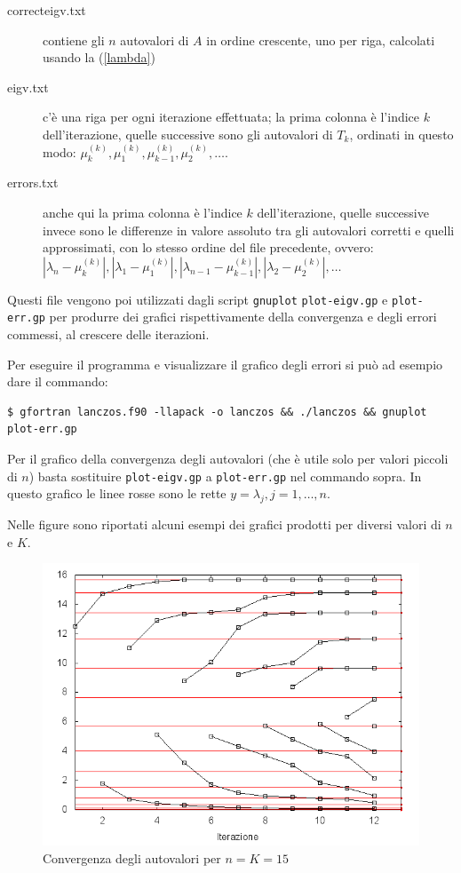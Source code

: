\documentclass[11pt]{article}
\numberwithin{equation}{subsection}
\theoremstyle{connome}
\theoremstyle{connomesenzanumero}
\theoremstyle{connome+}
\theoremstyle{connomesenzanumero+}
\begin{document}
\begin{description}
\item[correcteigv.txt] contiene gli $n$ autovalori di $A$ in ordine crescente, uno per riga, calcolati usando la (\ref{lambda})
\item[eigv.txt] c'è una riga per ogni iterazione effettuata; la prima colonna è l'indice $k$ dell'iterazione, quelle successive sono gli autovalori di $T_k$, ordinati in questo modo: $\mu_k^{(k)}, \mu_1^{(k)}, \mu_{k-1}^{(k)}, \mu_2^{(k)}, \ldots$.
\item[errors.txt] anche qui la prima colonna è l'indice $k$ dell'iterazione, quelle successive invece sono le differenze in valore assoluto tra gli autovalori corretti e quelli approssimati, con lo stesso ordine del file precedente, ovvero: $|\lambda_n - \mu_k^{(k)}|, |\lambda_1 - \mu_1^{(k)}|, |\lambda_{n-1} - \mu_{k-1}^{(k)}|, |\lambda_2 - \mu_2^{(k)}|, \ldots$
\end{description}

Questi file vengono poi utilizzati dagli script \verb~gnuplot~ \verb~plot-eigv.gp~ e \verb~plot-err.gp~ per produrre dei grafici rispettivamente della convergenza e degli errori commessi, al crescere delle iterazioni. 

Per eseguire il programma e visualizzare il grafico degli errori si può ad esempio dare il commando:
\begin{verbatim}
$ gfortran lanczos.f90 -llapack -o lanczos && ./lanczos && gnuplot plot-err.gp
\end{verbatim}

Per il grafico della convergenza degli autovalori (che è utile solo per valori piccoli di $n$) basta sostituire \verb~plot-eigv.gp~ a \verb~plot-err.gp~ nel commando sopra. In questo grafico le linee rosse sono le rette $y = \lambda_j, j=1, \ldots, n$.

Nelle figure sono riportati alcuni esempi dei grafici prodotti per diversi valori di $n$ e $K$.

\begin{figure}[htb]
\centering
\includegraphics[width=.9\linewidth]{img/eigv_n15K15.png}
\caption{Convergenza degli autovalori per $n = K = 15$}
\end{figure}
\end{document}
